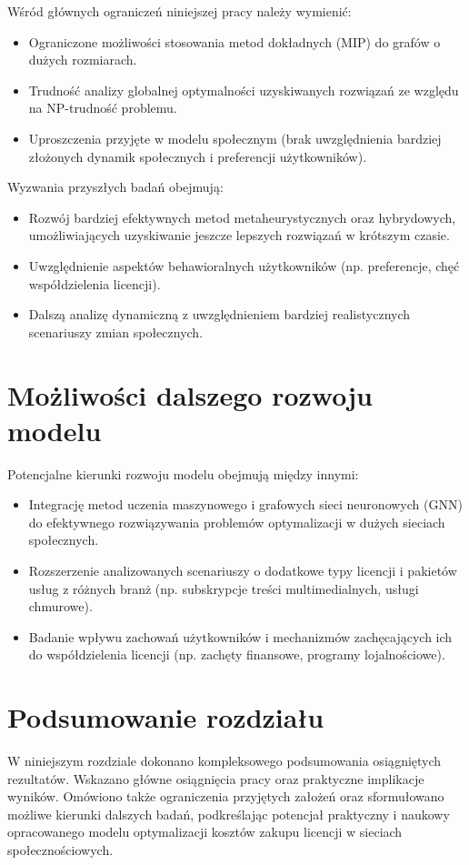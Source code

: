 Wśród głównych ograniczeń niniejszej pracy należy wymienić:

\begin{itemize}
    \item Ograniczone możliwości stosowania metod dokładnych (MIP) do grafów o dużych rozmiarach.
    \item Trudność analizy globalnej optymalności uzyskiwanych rozwiązań ze względu na NP-trudność problemu.
    \item Uproszczenia przyjęte w modelu społecznym (brak uwzględnienia bardziej złożonych dynamik społecznych i preferencji użytkowników).
\end{itemize}

Wyzwania przyszłych badań obejmują:

\begin{itemize}
    \item Rozwój bardziej efektywnych metod metaheurystycznych oraz hybrydowych, umożliwiających uzyskiwanie jeszcze lepszych rozwiązań w krótszym czasie.
    \item Uwzględnienie aspektów behawioralnych użytkowników (np. preferencje, chęć współdzielenia licencji).
    \item Dalszą analizę dynamiczną z uwzględnieniem bardziej realistycznych scenariuszy zmian społecznych.
\end{itemize}

\section{Możliwości dalszego rozwoju modelu}

Potencjalne kierunki rozwoju modelu obejmują między innymi:

\begin{itemize}
    \item Integrację metod uczenia maszynowego i grafowych sieci neuronowych (GNN) do efektywnego rozwiązywania problemów optymalizacji w dużych sieciach społecznych.
    \item Rozszerzenie analizowanych scenariuszy o dodatkowe typy licencji i pakietów usług z różnych branż (np. subskrypcje treści multimedialnych, usługi chmurowe).
    \item Badanie wpływu zachowań użytkowników i mechanizmów zachęcających ich do współdzielenia licencji (np. zachęty finansowe, programy lojalnościowe).
\end{itemize}

\section{Podsumowanie rozdziału}

W niniejszym rozdziale dokonano kompleksowego podsumowania osiągniętych rezultatów. Wskazano główne osiągnięcia pracy oraz praktyczne implikacje wyników. Omówiono także ograniczenia przyjętych założeń oraz sformułowano możliwe kierunki dalszych badań, podkreślając potencjał praktyczny i naukowy opracowanego modelu optymalizacji kosztów zakupu licencji w sieciach społecznościowych.

